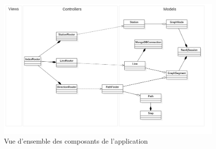 \begin{figure}
	\includegraphics[width=\textwidth]{img/ClassDiagram.png}
	\caption{Vue d'ensemble des composants de l'application}
	\label{fig:classDiagram}
\end{figure}	
